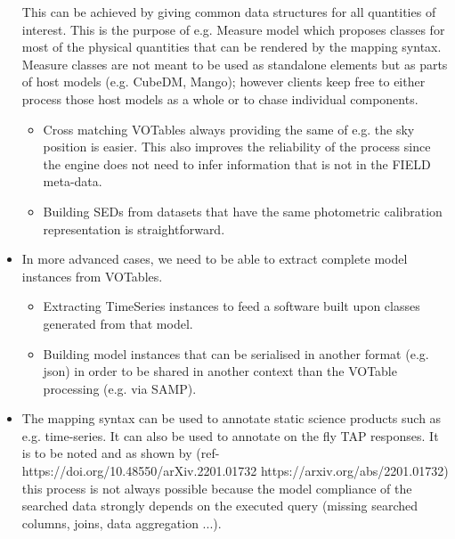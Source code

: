 \begin{itemize}
  This can be achieved by giving  common data structures for all 
  quantities of interest. This is the purpose of e.g. Measure model 
  which proposes classes for most of the physical quantities that can 
  be rendered by the mapping syntax. Measure classes are not meant to 
  be used as standalone elements but as parts of host models 
  (e.g. CubeDM, Mango);
  however clients keep free to either process those host models as a
  whole or to chase individual components.
    \begin{itemize}
      \item Cross matching VOTables always providing the same of e.g. the sky position is easier.
            This also improves the reliability of the process since the engine does not need to infer information that is not in the FIELD meta-data.
      \item Building SEDs from datasets that have the same photometric calibration representation is straightforward.
   \end{itemize}          

  \item In more advanced cases, we need to be able to extract complete model instances from VOTables.
    \begin{itemize}
      \item Extracting  TimeSeries instances to feed a software built upon classes generated from that model.
      \item Building model instances that can be serialised in another format (e.g. json) in order to be shared in another context than 
            the VOTable processing (e.g. via SAMP).
   \end{itemize}         
    
   \item The mapping syntax can be used to annotate static science products such as e.g. time-series. It can also be used to annotate 
   on the fly TAP responses.
   It is to be noted and as shown by (ref- https://doi.org/10.48550/arXiv.2201.01732 https://arxiv.org/abs/2201.01732) this process is not always 
   possible because the model compliance of the searched data strongly depends 
   on the executed query (missing searched columns, joins, data aggregation ...). 
   
    
\end{itemize} 

